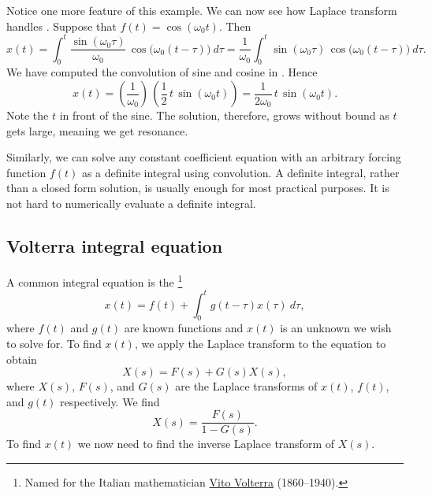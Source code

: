 \documentclass{ximera}
\begin{document}
Notice one more feature of this example. We can now see how Laplace transform handles .  Suppose that $f(t) = \cos (\omega_0 t)$.  Then
\begin{equation*}
    x(t) = \int_0^t \frac{\sin (\omega_0 \tau)}{\omega_0} \, \cos \bigl( \omega_0 (t-\tau) \bigr) ~ d\tau = \frac{1}{\omega_0} \int_0^t \sin ( \omega_0 \tau ) \, \cos \bigl(\omega_0 (t-\tau) \bigr) ~ d\tau .
\end{equation*}
We have computed the convolution of sine and cosine in .  Hence
\begin{equation*}
    x(t) = \left( \frac{1}{\omega_0} \right) \, \left( \frac{1}{2} \, t \, \sin ( \omega_0 t ) \right) = \frac{1}{2 \omega_0} \, t \, \sin ( \omega_0 t ). 
\end{equation*}
Note the $t$ in front of the sine.  The solution, therefore, grows without bound as $t$ gets large, meaning we get resonance.

Similarly, we can solve any constant coefficient equation with an arbitrary forcing function $f(t)$ as a definite integral using convolution. A definite integral, rather than a closed form solution, is usually enough for most practical purposes.  It is not hard to numerically evaluate a definite integral.

\subsection{Volterra integral equation}

A common integral equation is the \emph{}%
\footnote{
    Named for the Italian mathematician \href{https://en.wikipedia.org/wiki/Vito_Volterra}{Vito Volterra} (1860--1940).
    }
\begin{equation*}
    x(t) = f(t) + \int_0^t g(t-\tau) x(\tau) ~ d\tau ,
\end{equation*}
where $f(t)$ and $g(t)$ are known functions and $x(t)$ is an unknown we wish to solve for. To find $x(t)$, we apply the Laplace transform to the equation to obtain 
\begin{equation*}
    X(s) = F(s) + G(s) X(s) ,
\end{equation*}
where $X(s)$, $F(s)$, and $G(s)$ are the Laplace transforms of $x(t)$, $f(t)$, and $g(t)$ respectively.  We find
\begin{equation*}
    X(s) = \frac{F(s)}{1-G(s)} .
\end{equation*}
To find $x(t)$ we now need to find the inverse Laplace transform of $X(s)$.
\end{document}
